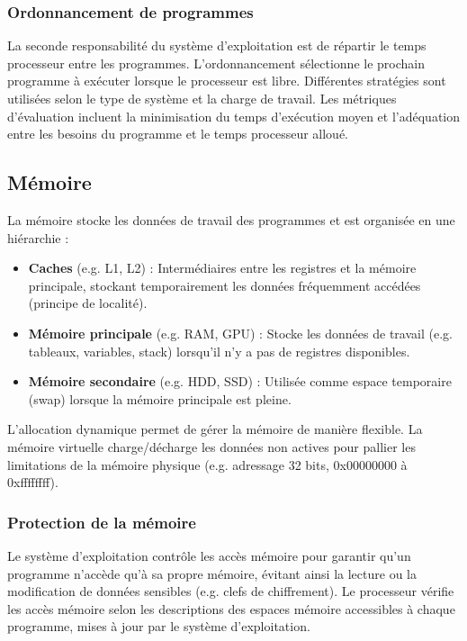 \subsubsection{Ordonnancement de programmes}

La seconde responsabilité du système d'exploitation est de répartir le temps processeur entre les programmes. L'ordonnancement sélectionne le prochain programme à exécuter lorsque le processeur est libre. Différentes stratégies sont utilisées selon le type de système et la charge de travail. Les métriques d'évaluation incluent la minimisation du temps d'exécution moyen et l'adéquation entre les besoins du programme et le temps processeur alloué.


\subsection{Mémoire}

La mémoire stocke les données de travail des programmes et est organisée en une hiérarchie :
\begin{itemize}
    \item \textbf{Caches} (e.g. L1, L2) : Intermédiaires entre les registres et la mémoire principale, stockant temporairement les données fréquemment accédées (principe de localité).
    \item \textbf{Mémoire principale} (e.g. RAM, GPU) : Stocke les données de travail (e.g. tableaux, variables, stack) lorsqu'il n'y a pas de registres disponibles.
    \item \textbf{Mémoire secondaire} (e.g. HDD, SSD) : Utilisée comme espace temporaire (swap) lorsque la mémoire principale est pleine.
\end{itemize}

L'allocation dynamique permet de gérer la mémoire de manière flexible. La mémoire virtuelle charge/décharge les données non actives pour pallier les limitations de la mémoire physique (e.g. adressage 32 bits, 0x00000000 à 0xffffffff).


\subsubsection{Protection de la mémoire}

Le système d'exploitation contrôle les accès mémoire pour garantir qu'un programme n'accède qu'à sa propre mémoire, évitant ainsi la lecture ou la modification de données sensibles (e.g. clefs de chiffrement). Le processeur vérifie les accès mémoire selon les descriptions des espaces mémoire accessibles à chaque programme, mises à jour par le système d'exploitation.

